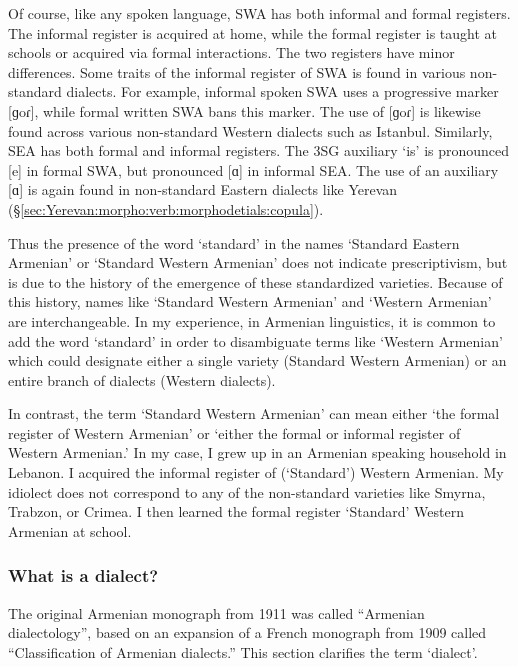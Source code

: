 Of course, like any spoken language, SWA has both informal and formal registers. The informal register is acquired at home, while the formal register is taught at schools or acquired via formal interactions.  The two registers have minor differences. Some traits of the informal register of SWA is found in various non-standard dialects. For example,  informal spoken SWA     uses a progressive marker [ɡoɾ], while formal written SWA bans this marker. The use of [ɡoɾ] is likewise found across various non-standard Western dialects such as Istanbul. Similarly, SEA has both formal and informal registers. The 3SG auxiliary `is' is pronounced [e] in formal SWA, but pronounced [ɑ] in informal SEA. The use of an auxiliary [ɑ] is again found in non-standard Eastern dialects like Yerevan (\S\ref{sec:Yerevan:morpho:verb:morphodetials:copula}). 

Thus the presence of the word `standard' in the names `Standard Eastern Armenian' or `Standard Western Armenian' does not indicate prescriptivism, but is due to the history of the emergence of these standardized varieties. Because of this history, names like `Standard Western Armenian' and   `Western Armenian' are interchangeable. In my experience, in Armenian linguistics, it is common to add the word `standard' in order to disambiguate terms like `Western Armenian' which could designate either a single variety (Standard Western Armenian) or an entire branch of dialects (Western dialects). 

In contrast, the term `Standard Western Armenian' can mean either `the formal register of Western Armenian' or `either the formal or informal register of Western Armenian.'  In my case,  I grew up in an Armenian speaking household in Lebanon. I acquired the informal register of (`Standard') Western Armenian. My idiolect does not correspond to any of the non-standard varieties like Smyrna, Trabzon, or Crimea.  I then learned the formal register `Standard' Western Armenian at school. 








\subsubsection{What is a dialect?}

The original Armenian monograph from 1911 was called ``Armenian dialectology'', based on an expansion of a French monograph from 1909 called ``Classification of Armenian dialects.'' This section clarifies the term `dialect'. 

